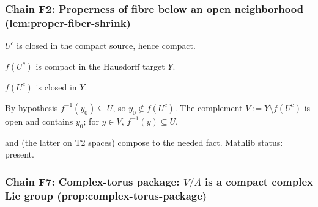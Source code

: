 \subsubsection*{Chain F2: Properness of fibre below an open neighborhood (lem:proper-fiber-shrink)}

\begin{lemma}
\label{lem:pfs-r1}
$U^{c}$ is closed in the compact source, hence compact.
\leanok\mathlibok
\end{lemma}

\begin{lemma}
\label{lem:pfs-r2}
$f(U^{c})$ is compact in the Hausdorff target $Y$.
\leanok\mathlibok
\end{lemma}

\begin{lemma}
\label{lem:pfs-r3}
$f(U^{c})$ is closed in $Y$.
\leanok\mathlibok
\end{lemma}

\begin{lemma}
\label{lem:pfs-r4}
By hypothesis $f^{-1}(y_{0}) \subseteq U$, so $y_{0} \notin f(U^{c})$.  The complement $V := Y \setminus f(U^{c})$ is open and contains $y_{0}$; for $y \in V$, $f^{-1}(y) \subseteq U$.
\leanok\mathlibok
\end{lemma}

\begin{lemma}
\label{lem:pfs-r5}
 and  (the latter on T2 spaces) compose to the needed fact.  Mathlib status: present.
\leanok\mathlibok
\end{lemma}

\subsubsection*{Chain F7: Complex-torus package: $V/\Lambda$ is a compact complex Lie group (prop:complex-torus-package)}

